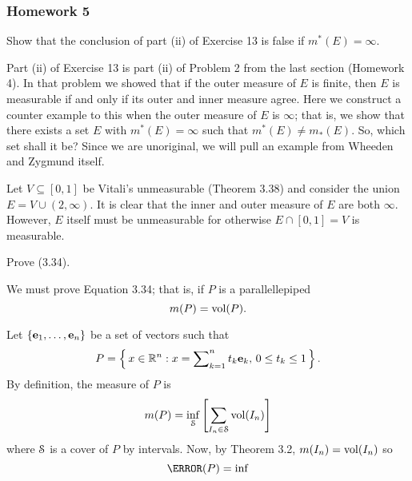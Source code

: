 \subsubsection{Homework 5}
\setcounter{exercise}{0}
\setcounter{equation}{0}

\begin{problem}
  Show that the conclusion of part (ii) of Exercise 13 is false if
  $m^*(E)=\infty$.
\end{problem}
\begin{solution}
  Part (ii) of Exercise 13 is part (ii) of Problem 2 from the last section
  (Homework 4). In that problem we showed that if the outer measure of $E$
  is finite, then $E$ is measurable if and only if its outer and inner
  measure agree. Here we construct a counter example to this when the outer
  measure of $E$ is $\infty$; that is, we show that there exists a set $E$
  with $m^*(E)=\infty$ such that $m^*(E)\neq m_*(E)$. So, which set shall
  it be? Since we are unoriginal, we will pull an example from Wheeden and
  Zygmund itself.

  Let $V\subseteq[0,1]$ be Vitali's unmeasurable (Theorem 3.38) and consider
  the union $E=V\cup(2,\infty)$. It is clear that the inner and outer
  measure of $E$ are both $\infty$. However, $E$ itself must be
  unmeasurable for otherwise $E\cap [0,1]=V$ is measurable.
\end{solution}

\begin{problem}
  Prove (3.34).
\end{problem}
\begin{solution}
  We must prove Equation 3.34; that is, if $P$ is a parallellepiped
  \[
    m(P)=\operatorname{vol}(P).
  \]

  Let $\{\mathbf{e}_1,\ldots,\mathbf{e}_n\}$ be a set of vectors such that
  \[
    P=\left\{\,x\in\mathbb{R}^n:
      \text{$x=\sum\nolimits_{k=1}^n t_k\mathbf{e}_k$, $0\leq t_k\leq 1$}\,\right\}.
  \]
  By definition, the measure of $P$ is
  \[
    m(P)=\inf_{\mathcal{S}}\left[\sum_{I_n\in\mathcal{S}}\operatorname{vol}(I_n)\right]
  \]
  where $\mathcal{S}$ is a cover of $P$ by intervals. Now, by Theorem 3.2,
  $m(I_n)=\operatorname{vol}(I_n)$ so
  \[
    \m(P)=\inf
  \]
\end{solution}

